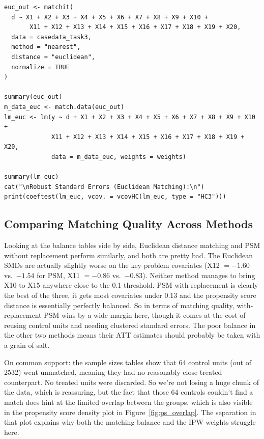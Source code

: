 \documentclass[12pt,a4paper]{article}
\begin{document}
\begin{lstlisting}
euc_out <- matchit(
  d ~ X1 + X2 + X3 + X4 + X5 + X6 + X7 + X8 + X9 + X10 +
       X11 + X12 + X13 + X14 + X15 + X16 + X17 + X18 + X19 + X20,
  data = casedata_task3,
  method = "nearest",
  distance = "euclidean",
  normalize = TRUE
)

summary(euc_out)
m_data_euc <- match.data(euc_out)
lm_euc <- lm(y ~ d + X1 + X2 + X3 + X4 + X5 + X6 + X7 + X8 + X9 + X10 +
             X11 + X12 + X13 + X14 + X15 + X16 + X17 + X18 + X19 + X20,
             data = m_data_euc, weights = weights)

summary(lm_euc)
cat("\nRobust Standard Errors (Euclidean Matching):\n")
print(coeftest(lm_euc, vcov. = vcovHC(lm_euc, type = "HC3")))
\end{lstlisting}

\subsection{Comparing Matching Quality Across Methods}

Looking at the balance tables side by side, Euclidean distance matching and PSM without replacement perform similarly, and both are pretty bad. The Euclidean SMDs are actually slightly worse on the key problem covariates (X12 $= -1.60$ vs.\ $-1.54$ for PSM, X11 $= -0.86$ vs.\ $-0.83$). Neither method manages to bring X10 to X15 anywhere close to the 0.1 threshold. PSM with replacement is clearly the best of the three, it gets most covariates under 0.13 and the propensity score distance is essentially perfectly balanced. So in terms of matching quality, with-replacement PSM wins by a wide margin here, though it comes at the cost of reusing control units and needing clustered standard errors. The poor balance in the other two methods means their ATT estimates should probably be taken with a grain of salt.

On common support: the sample sizes tables show that 64 control units (out of 2532) went unmatched, meaning they had no reasonably close treated counterpart. No treated units were discarded. So we're not losing a huge chunk of the data, which is reassuring, but the fact that those 64 controls couldn't find a match does hint at the limited overlap between the groups, which is also visible in the propensity score density plot in Figure~\ref{fig:ps_overlap}. The separation in that plot explains why both the matching balance and the IPW weights struggle here.
\end{document}
